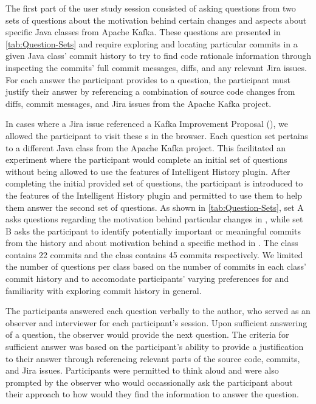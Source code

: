 The first part of the user study session consisted of asking questions from two sets of questions about the motivation behind certain changes and aspects about specific Java classes from Apache Kafka.
These questions are presented in \autoref{tab:Question-Sets} and require exploring and locating particular commits in a given Java class' commit history to try to find code rationale information through inspecting the commits' full commit messages,
diffs, and any relevant Jira issues.
For each answer the participant provides to a question, the participant must justify their answer by referencing a combination of source code changes from diffs,
commit messages, and Jira issues from the Apache Kafka project.

In cases where a Jira issue referenced a Kafka Improvement Proposal (), we allowed the participant to visit these s in the browser.
Each question set pertains to a different Java class from the Apache Kafka project.
This facilitated an experiment where the participant would complete an initial set of questions without being allowed to use the features of Intelligent History plugin.
After completing the initial provided set of questions, the participant is introduced to the features of the Intelligent History plugin and permitted to use them to help them answer the second set of questions.
As shown in \autoref{tab:Question-Sets}, set A asks questions regarding the motivation behind particular changes in , while set B asks the participant to identify potentially important or meaningful commits from the history and about motivation behind a specific method in .
The  class contains 22 commits and the  class contains 45 commits respectively.
We limited the number of questions per class based on the number of commits in each class' commit history and to accomodate participants' varying preferences for and familiarity with exploring commit history in general.

The participants answered each question verbally to the author, who served as an observer and interviewer for each participant's session.
Upon sufficient answering of a question, the observer would provide the next question.
The criteria for sufficient answer was based on the participant's ability to provide a justification to their answer through referencing relevant parts of the source code, commits, and Jira issues.
Participants were permitted to think aloud and were also prompted by the observer who would occassionally ask the participant about their approach to how would they find the information to answer the question.

